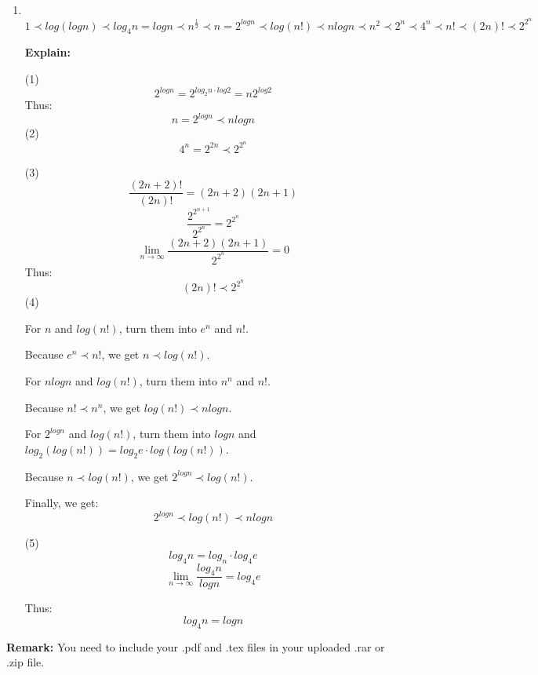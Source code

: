 \documentclass[12pt,a4paper]{article}
\makeatletter
\newtheorem*{solution}{Solution}
\theoremstyle{definition}
\renewenvironment{solution}[1][Solution] {\par\pushQED{\qed}\normalfont\topsep6\p@\@plus6\p@\relax\trivlist\item[\hskip\labelsep\bfseries#1\@addpunct{.}]\ignorespaces}{\popQED\endtrivlist\@endpefalse} \makeatother
\makeatother
\begin{document}
\begin{enumerate}
\begin{solution}
~\\
$$
1 \prec log(logn) \prec log_4n= logn \prec n^{\frac{1}{2}} \prec n = 2^{logn} \prec log(n!) \prec nlogn \prec n^2 \prec 2^n \prec 4^n \prec n! \prec (2n)! \prec 2^{2^n}
$$

\textbf{Explain:}

(1)
$$
2^{logn} = 2^{log_2n \cdot log2} = n2^{log2}
$$
Thus:
$$
n = 2^{logn}\prec nlogn
$$
(2)
$$
4^n = 2^{2n} \prec 2^{2^n}
$$

(3)
$$
\frac{(2n+2)! }{(2n)!}=(2n+2)(2n+1)
$$
$$
\frac{2^{2^{n+1}}}{2^{2^n}} = 2^{2^n}
$$
$$
\lim_{n\rightarrow \infty}\frac{(2n+2)(2n+1)}{2^{2^n}} = 0
$$
Thus:
$$
(2n)!\prec 2^{2^n}
$$
(4)

For $n$ and $log(n!)$, turn them into $e^n$ and $n!$.

Because $e^n\prec n!$, we get $n\prec log(n!)$.

For $nlogn$ and $log(n!)$, turn them into $n^n$ and $n!$.

Because $n!\prec n^n$, we get $log(n!) \prec nlogn$.

For $2^{logn}$ and $log(n!)$, turn them into $logn$ and $log_2(log(n!)) =log_2e \cdot log(log(n!))$.

Because $n\prec log(n!)$, we get $2^{logn}\prec log(n!)$.

Finally, we get:
$$
2^{logn}\prec log(n!) \prec nlogn
$$

(5)
$$
log_4n =log_n\cdot log_4e
$$
$$
\lim_{n\rightarrow \infty}\frac{log_4n}{logn} = log_4e
$$

Thus:
$$
log_4n = logn
$$

 \end{solution}


\end{enumerate}

\vspace{20pt}

\textbf{Remark:} You need to include your .pdf and .tex files in your uploaded .rar or .zip file.

\end{document}
